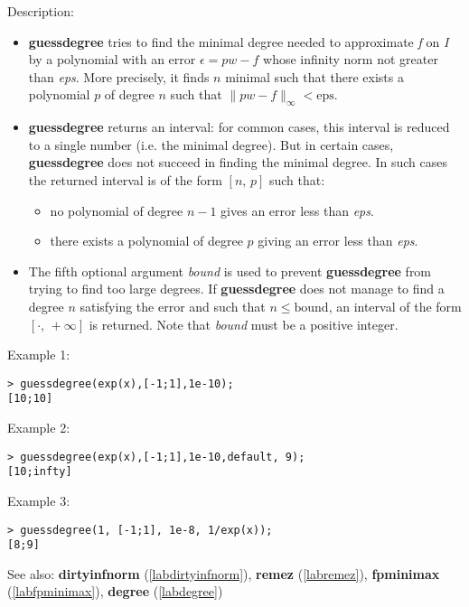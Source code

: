 \noindent Description: \begin{itemize}

\item \textbf{guessdegree} tries to find the minimal degree needed to approximate \emph{f}
   on \emph{I} by a polynomial with an error $\epsilon=p w - f$ whose infinity norm not
   greater than \emph{eps}. More precisely, it finds $n$ minimal such that there exists
   a polynomial $p$ of degree $n$ such that $\|p w-f\|_{\infty} < \mathrm{eps}$.

\item \textbf{guessdegree} returns an interval: for common cases, this interval is reduced
   to a single number (i.e. the minimal degree). But in certain cases,
   \textbf{guessdegree} does not succeed in finding the minimal degree. In such cases the
   returned interval is of the form $[n,\,p]$ such that:
   \begin{itemize}
   \item no polynomial of degree $n-1$ gives an error less than \emph{eps}.
   \item there exists a polynomial of degree $p$ giving an error less than \emph{eps}.
   \end{itemize}

\item The fifth optional argument \emph{bound} is used to prevent \textbf{guessdegree} from
   trying to find too large degrees. If \textbf{guessdegree} does not manage to find a
   degree $n$ satisfying the error and such that $n \le \textrm{bound}$, an interval of the
   form $[\cdot,\,+\infty]$ is returned. Note that \emph{bound} must be a positive integer.
\end{itemize}
\noindent Example 1: 
\begin{center}\begin{minipage}{15cm}\begin{Verbatim}[frame=single,commandchars=\\\|\~]
> guessdegree(exp(x),[-1;1],1e-10);
[10;10]
\end{Verbatim}
\end{minipage}\end{center}
\noindent Example 2: 
\begin{center}\begin{minipage}{15cm}\begin{Verbatim}[frame=single,commandchars=\\\|\~]
> guessdegree(exp(x),[-1;1],1e-10,default, 9);
[10;infty]
\end{Verbatim}
\end{minipage}\end{center}
\noindent Example 3: 
\begin{center}\begin{minipage}{15cm}\begin{Verbatim}[frame=single,commandchars=\\\|\~]
> guessdegree(1, [-1;1], 1e-8, 1/exp(x));
[8;9]
\end{Verbatim}
\end{minipage}\end{center}
See also: \textbf{dirtyinfnorm} (\ref{labdirtyinfnorm}), \textbf{remez} (\ref{labremez}), \textbf{fpminimax} (\ref{labfpminimax}), \textbf{degree} (\ref{labdegree})
